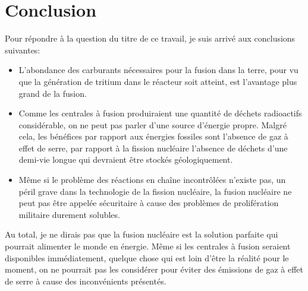 \documentclass[12pt,a4paper]{article}
\begin{document}
\section{Conclusion} %
Pour répondre à la question du titre de ce travail, je suis arrivé aux conclusions suivantes:
\begin{itemize}
\item L'abondance des carburants nécessaires pour la fusion dans la terre, pour vu que la génération de tritium dans le réacteur soit atteint, est l'avantage plus grand de la fusion.
\item Comme les centrales à fusion produiraient une quantité de déchets radioactifs considérable, on ne peut pas parler d'une source d'énergie propre. Malgré cela, les bénéfices par rapport aux énergies fossiles sont l'absence de gaz à effet de serre, par rapport à la fission nucléaire l'absence de déchets d'une demi-vie longue qui devraient être stockés géologiquement.
\item Même si le problème des réactions en chaîne incontrôlées n'existe pas, un péril grave dans la technologie de la fission nucléaire, la fusion nucléaire ne peut pas être appelée sécuritaire à cause des problèmes de prolifération militaire durement solubles.
\end{itemize}
Au total, je ne dirais pas que la fusion nucléaire est la solution parfaite qui pourrait alimenter le monde en énergie. Même si les centrales à fusion seraient dis\-po\-ni\-bles immédiatement, quelque chose qui est loin d'être la réalité pour le moment, on ne pourrait pas les considérer pour éviter des émissions de gaz à effet de serre à cause des inconvénients présentés.
\end{document}
